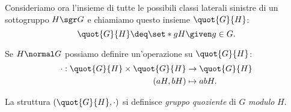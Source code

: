Consideriamo ora l'insieme di tutte le possibili classi laterali sinistre di un sottogruppo $H \sgr G$ e chiamiamo questo insieme $\quot{G}{H}$: \begin{equation}
    \quot{G}{H} \deq \set*{gH \given g \in G}.
\end{equation}

Se $H \normal G$ possiamo definire un'operazione su $\quot{G}{H}$: \begin{align} \label{eq:op_gruppo_quoziente}
    \begin{split}
        \cdot : \quot{G}{H} \times \quot{G}{H} &\to \quot{G}{H} \\
        (aH, bH) &\mapsto abH.
    \end{split}
\end{align}

La struttura $(\quot{G}{H}, \cdot)$ si definisce \emph{gruppo quoziente} di $G$ \emph{modulo} $H$.


